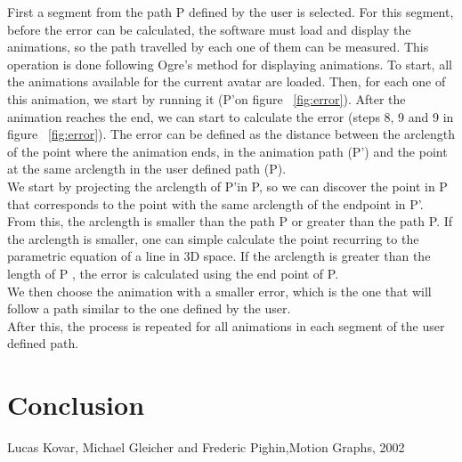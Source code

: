 \documentclass[a4paper]{article}
\begin{document}
First a segment from the path P defined by the user is selected. For this segment, before the error can be calculated, the software must load and display the animations, so the path travelled by each one of them can be measured. This operation is done following Ogre\textquoteright s method for displaying animations. To start, all the animations available for the current avatar are loaded. Then, for each one of this animation, we start by running it (P\textquoteright on figure ~\ref{fig:error}). After the animation reaches the end, we can start to calculate the error (steps 8, 9 and 9 in figure ~\ref{fig:error}). The error can be defined as the distance between the arclength of the point where the animation ends, in the animation path (P\textquoteright) and the point at the same arclength in the user defined path (P).  
\\

We start by projecting the arclength of P\textquoteright in P, so we can discover the point in P that corresponds to the point with the same arclength of the endpoint in P\textquoteright. From this, the arclength is smaller than the path P or greater than the path P.  If the arclength is smaller, one can simple calculate the point recurring to the parametric equation of a line in 3D space.  If the arclength is greater than the length of P , the error is calculated using the end point of P. 
\\

We then choose the animation with a smaller error, which is the one that will follow a path similar to the one defined by the user. 
\\

After this, the process is repeated for all animations in each segment of the user defined path. 






\section{Conclusion}




\begin{thebibliography}{}

{Lucas Kovar, Michael Gleicher and Frederic Pighin},{Motion Graphs}, {2002}
    
    
\end{thebibliography} 
\end{document}
